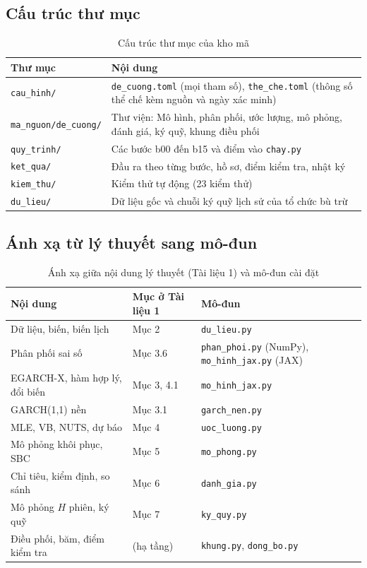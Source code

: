 \documentclass[12pt,a4paper]{article}
\theoremstyle{remark}
\newcommand{\ma}[1]{\texttt{\small #1}}
\begin{document}
\subsection{Cấu trúc thư mục}

\begin{table}[h]
\centering
\caption{Cấu trúc thư mục của kho mã}\label{tab:thumuc}
\begin{tabular}{@{}lp{10.2cm}@{}}
\toprule
\textbf{Thư mục} & \textbf{Nội dung} \\
\midrule
\ma{cau\_hinh/} & \ma{de\_cuong.toml} (mọi tham số), \ma{the\_che.toml} (thông số thể chế kèm nguồn và ngày xác minh) \\
\ma{ma\_nguon/de\_cuong/} & Thư viện: Mô hình, phân phối, ước lượng, mô phỏng, đánh giá, ký quỹ, khung điều phối \\
\ma{quy\_trinh/} & Các bước b00 đến b15 và điểm vào \ma{chay.py} \\
\ma{ket\_qua/} & Đầu ra theo từng bước, hồ sơ, điểm kiểm tra, nhật ký \\
\ma{kiem\_thu/} & Kiểm thử tự động (23 kiểm thử) \\
\ma{du\_lieu/} & Dữ liệu gốc và chuỗi ký quỹ lịch sử của tổ chức bù trừ \\
\bottomrule
\end{tabular}
\end{table}

\subsection{Ánh xạ từ lý thuyết sang mô-đun}

\begin{table}[h]
\centering
\caption{Ánh xạ giữa nội dung lý thuyết (Tài liệu 1) và mô-đun cài đặt}\label{tab:anhxa}
\begin{tabular}{@{}p{5.4cm}p{3.6cm}p{5.2cm}@{}}
\toprule
\textbf{Nội dung} & \textbf{Mục ở Tài liệu 1} & \textbf{Mô-đun} \\
\midrule
Dữ liệu, biến, biến lịch & Mục 2 & \ma{du\_lieu.py} \\
Phân phối sai số & Mục 3.6 & \ma{phan\_phoi.py} (NumPy), \ma{mo\_hinh\_jax.py} (JAX) \\
EGARCH-X, hàm hợp lý, đổi biến & Mục 3, 4.1 & \ma{mo\_hinh\_jax.py} \\
GARCH(1,1) nền & Mục 3.1 & \ma{garch\_nen.py} \\
MLE, VB, NUTS, dự báo & Mục 4 & \ma{uoc\_luong.py} \\
Mô phỏng khôi phục, SBC & Mục 5 & \ma{mo\_phong.py} \\
Chỉ tiêu, kiểm định, so sánh & Mục 6 & \ma{danh\_gia.py} \\
Mô phỏng $H$ phiên, ký quỹ & Mục 7 & \ma{ky\_quy.py} \\
Điều phối, băm, điểm kiểm tra & (hạ tầng) & \ma{khung.py}, \ma{dong\_bo.py} \\
\bottomrule
\end{tabular}
\end{table}
\end{document}
